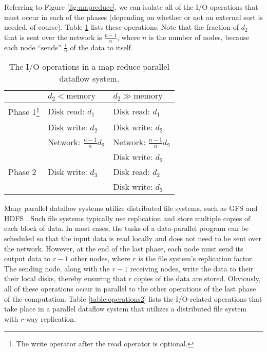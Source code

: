 \documentclass[ 11pt, letterpaper]{article}%
\begin{document}
Referring to Figure \ref{fig:mapreduce}, we can isolate all of the I/O
operations that must occur in each of the phases (depending on whether or not
an external sort is needed, of course). Table \ref{table:operations1} lists
these operations. Note that the fraction of $d_2$ that is sent
over the network is $\frac{n-1}{n}$, where $n$ is the number of nodes, because
each node ``sends'' $\frac{1}{n}$ of the data to itself.

\begin{table}
\centering
\begin{minipage}{1\textwidth}
\centering
\renewcommand{\arraystretch}{1.2}
\begin{tabular}{|l|l|l|}
\hline
        & $d_2 < \text{memory}$          & $d_2 \gg \text{memory}$ \\ \hline
Phase 1\footnote{The write operator after the read operator is optional.}
& Disk read: $d_1$ & Disk read: $d_1$ \\ & Disk write: $d_2$ & Disk
        write: $d_2$ \\ & Network: $\frac{n-1}{n}
        d_2$ & Network: $\frac{n-1}{n} d_2$ \\ &                                & Disk write: $d_2$ \\ \hline Phase 2 & Disk write: $d_3$              & Disk read: $d_2$ \\ &                                & Disk write: $d_3$ \\ \hline
\end{tabular}
\caption{The I/O-operations in a map-reduce parallel dataflow system.}
\label{table:operations1}
\end{minipage}
\end{table}

Many parallel dataflow systems utilize distributed file systems, such as GFS \cite{gfs} and HDFS \cite{hdfs}. Such file systems typically use replication and store multiple copies of each block of data. In most cases, the tasks of a data-parallel program can be scheduled so that the input data is read locally and does not need to be sent over the network. However, at the end of the last phase, each node must send its output data to $r - 1$ other nodes, where $r$ is the file system's replication factor. The sending node, along with the $r - 1$ receiving nodes, write the data to their their local disks, thereby ensuring that $r$ copies of the data are stored. Obviously, all of these operations occur in parallel to the other operations of the last phase of the computation. Table \ref{table:operations2} lists the I/O-related operations that take place in a parallel dataflow system that utilizes a distributed file system with $r$-way replication.
\end{document}
